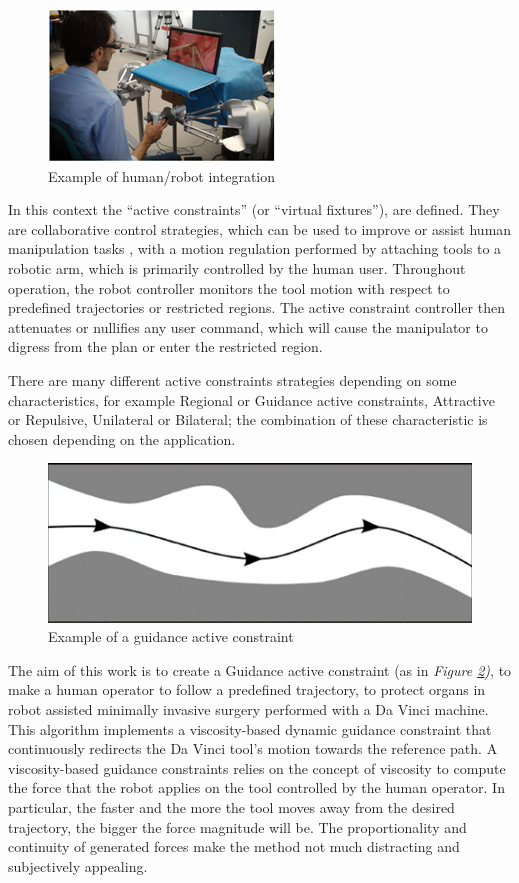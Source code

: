 \documentclass[conference]{IEEEtran}
\begin{document}
\begin{figure}[h!]
    \centering
    \includegraphics{intro1.png}
    \caption{Example of human/robot integration}
    \label{fig:intro1}
\end{figure}

In this context the “active constraints” (or “virtual fixtures”), are defined. They are collaborative control strategies, which can be used to improve or assist human manipulation tasks \cite{acvf}, with a motion regulation performed by attaching tools to a robotic arm, which is primarily controlled by the human user.
Throughout operation, the robot controller monitors the tool motion with respect to predefined trajectories or restricted regions. The active constraint controller then attenuates or nullifies any user command, which will cause the manipulator to digress from the plan or enter the restricted region.

There are many different active constraints strategies depending on some characteristics, for example Regional or Guidance active constraints, Attractive or Repulsive, Unilateral or Bilateral\cite{acvf}; the combination of these characteristic is chosen depending on the application. 

\begin{figure}[h]
    \centering
    \includegraphics{intro2.png}
    \caption{Example of a guidance active constraint}
    \label{fig:intro2}
\end{figure}
The aim of this work is to create a Guidance active constraint (as in \textit{Figure \ref{fig:intro2})}, to make a human operator to follow a predefined trajectory, to protect organs in robot assisted minimally invasive surgery performed with a Da Vinci machine.
This algorithm implements a viscosity-based dynamic guidance constraint that continuously redirects the Da Vinci tool’s motion towards the reference path.
A viscosity-based guidance constraints relies on the concept of viscosity to compute the force that the robot applies on the tool controlled by the human operator. In particular, the faster and the more the tool moves away from the desired trajectory, the bigger the force magnitude will be. The proportionality and continuity of generated forces make the method not much distracting and subjectively appealing.
\end{document}
